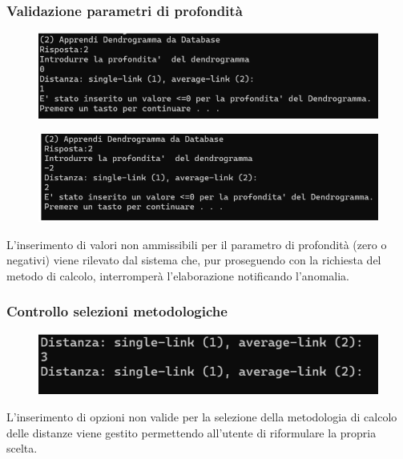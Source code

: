 \subsubsection{Validazione parametri di profondità} 
    \begin{figure}[h!]
        \centering
        \includegraphics[width=\textwidth]{images/0_valore_errato.png}
    \end{figure}

    \begin{figure}[h!]
        \centering
        \includegraphics[width=\textwidth]{images/-2_valore_errato.png}
    \end{figure}

    L'inserimento di valori non ammissibili per il parametro di profondità (zero o negativi) viene rilevato dal sistema che, pur proseguendo con la richiesta del metodo di calcolo, interromperà l'elaborazione notificando l'anomalia.

\subsubsection{Controllo selezioni metodologiche} 
    
\begin{figure}[h!]
        \centering
        \includegraphics[width=\textwidth]{images/controllo_metodologie.png}
    \end{figure}
    L'inserimento di opzioni non valide per la selezione della metodologia di calcolo delle distanze viene gestito permettendo all'utente di riformulare la propria scelta.

